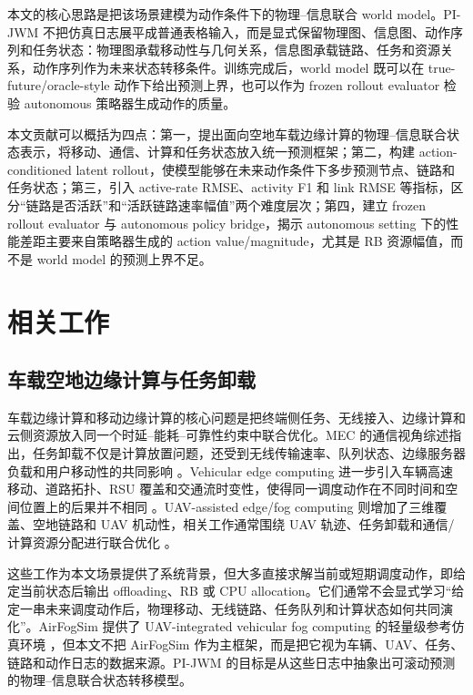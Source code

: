 \documentclass[letterpaper,journal]{IEEEtran}
\newcommand{\pjwm}{PI-JWM}
\begin{document}
本文的核心思路是把该场景建模为动作条件下的物理--信息联合 world model。\pjwm{} 不把仿真日志展平成普通表格输入，而是显式保留物理图、信息图、动作序列和任务状态：物理图承载移动性与几何关系，信息图承载链路、任务和资源关系，动作序列作为未来状态转移条件。训练完成后，world model 既可以在 true-future/oracle-style 动作下给出预测上界，也可以作为 frozen rollout evaluator 检验 autonomous 策略器生成动作的质量。

本文贡献可以概括为四点：第一，提出面向空地车载边缘计算的物理--信息联合状态表示，将移动、通信、计算和任务状态放入统一预测框架；第二，构建 action-conditioned latent rollout，使模型能够在未来动作条件下多步预测节点、链路和任务状态；第三，引入 active-rate RMSE、activity F1 和 link RMSE 等指标，区分“链路是否活跃”和“活跃链路速率幅值”两个难度层次；第四，建立 frozen rollout evaluator 与 autonomous policy bridge，揭示 autonomous setting 下的性能差距主要来自策略器生成的 action value/magnitude，尤其是 RB 资源幅值，而不是 world model 的预测上界不足。

\section{相关工作}

\subsection{车载空地边缘计算与任务卸载}

车载边缘计算和移动边缘计算的核心问题是把终端侧任务、无线接入、边缘计算和云侧资源放入同一个时延--能耗--可靠性约束中联合优化。MEC 的通信视角综述指出，任务卸载不仅是计算放置问题，还受到无线传输速率、队列状态、边缘服务器负载和用户移动性的共同影响 \cite{mao2017mecsurvey}。Vehicular edge computing 进一步引入车辆高速移动、道路拓扑、RSU 覆盖和交通流时变性，使得同一调度动作在不同时间和空间位置上的后果并不相同 \cite{raza2019vecsurvey}。UAV-assisted edge/fog computing 则增加了三维覆盖、空地链路和 UAV 机动性，相关工作通常围绕 UAV 轨迹、任务卸载和通信/计算资源分配进行联合优化 \cite{li2021uavedgerl}。

这些工作为本文场景提供了系统背景，但大多直接求解当前或短期调度动作，即给定当前状态后输出 offloading、RB 或 CPU allocation。它们通常不会显式学习“给定一串未来调度动作后，物理移动、无线链路、任务队列和计算状态如何共同演化”。AirFogSim 提供了 UAV-integrated vehicular fog computing 的轻量级参考仿真环境 \cite{airfogsim2025tmc}，但本文不把 AirFogSim 作为主框架，而是把它视为车辆、UAV、任务、链路和动作日志的数据来源。PI-JWM 的目标是从这些日志中抽象出可滚动预测的物理--信息联合状态转移模型。
\end{document}
